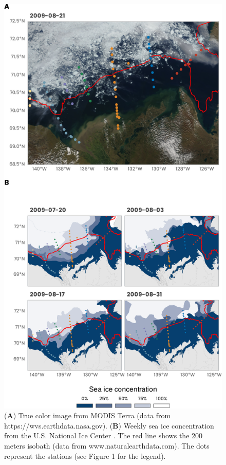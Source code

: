 \documentclass[essd, manuscript]{copernicus}
\begin{document}
\begin{figure}[H]
    \centering
    \includegraphics[scale = 0.75]{../../../graphs/fig02.pdf}
    \caption{(\textbf{A}) True color image from MODIS Terra (data from https://wvs.earthdata.nasa.gov). (\textbf{B}) Weekly sea ice concentration from the U.S. National Ice Center \citep{NSIDCG10033}. The red line shows the 200 meters isobath (data from www.naturalearthdata.com). The dots represent the stations (see Figure 1 for the legend).}
\end{figure}
\end{document}
